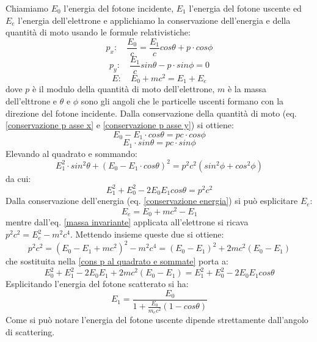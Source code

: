 Chiamiamo $E_{0}$ l'energia del fotone incidente, $E_{1}$ l'energia del fotone uscente ed $E_{e}$ l'energia dell'elettrone e applichiamo la conservazione dell'energia e della quantità di moto usando le formule relativistiche:
\begin{equation}
    p_{x}: \quad \frac{E_{0}}{c} = \frac{E_{1}}{c} cos\theta + p\cdot cos\phi
\label{conservazione p asse x}
\end{equation}
\begin{equation}
    p_{y}: \quad \frac{E_{1}}{c} sin\theta - p\cdot sin\phi = 0
\label{conservazione p asse y}
\end{equation}
\begin{equation}
    E: \quad E_{0} + m c^{2} = E_{1} + E_{e}
\label{conservazione energia}
\end{equation}
dove $p$ è il modulo della quantità di moto dell'elettrone, $m$ è la massa dell'elttrone e $\theta$ e $\phi$ sono gli angoli che le particelle uscenti formano con la direzione del fotone incidente.
Dalla conservazione della quantità di moto (eq. \eqref{conservazione p asse x} e \eqref{conservazione p asse y}) si ottiene:
\begin{equation}
    E_{0} - E_{1} \cdot cos\theta = pc\cdot cos\phi
\end{equation}
\begin{equation}
    E_{1} \cdot sin\theta = pc\cdot sin\phi
\end{equation}
Elevando al quadrato e sommando:
\begin{equation}
    E_{1}^{2} \cdot sin^{2}\theta + (E_{0} - E_{1} \cdot cos\theta)^{2} = p^{2}c^{2} (sin^{2}\phi + cos^{2}\phi)
\end{equation}
da cui:
\begin{equation}
    E_{1}^{2} + E_{0}^{2} - 2 E_{0} E_{1} cos\theta = p^{2}c^{2}
\label{cons p al quadrato e sommate}
\end{equation}
Dalla conservazione dell'energia (eq. \eqref{conservazione energia}) si può esplicitare $E_{e}$:
\begin{equation}
    E_{e} = E_{0} + m c^{2} - E_{1}
\label{Ee esplicitata}
\end{equation}
mentre dall'eq. \eqref{massa invariante} applicata all'elettrone si ricava $p^{2}c^{2} = E_{e}^{2} - m^{2} c^{4}$. Mettendo insieme queste due si ottiene:
\begin{equation}
    p^{2}c^{2} = (E_{0} - E_{1} + m c^{2})^{2} - m^{2} c^{4} = (E_{0} - E_{1})^{2} + 2 m c^{2}(E_{0} - E_{1})
\end{equation}
che sostituita nella \eqref{cons p al quadrato e sommate} porta a:
\begin{equation}
    E_{0}^{2} + E_{1}^{2} - 2E_{0}E_{1} + 2 m c^{2}(E_{0} - E_{1}) = E_{1}^{2} + E_{0}^{2} - 2 E_{0} E_{1} cos\theta
\end{equation}
Esplicitando l'energia del fotone scatterato si ha:
\begin{equation}
    E_{1} = \frac{E_{0}}{1 + \frac{E_{0}}{m_{e}c^{2}}(1-cos\theta)}
    \label{energia fotone uscente}
\end{equation}
Come si può notare l'energia del fotone uscente dipende strettamente dall'angolo di scattering.
